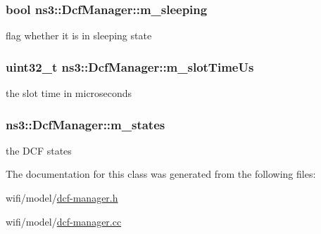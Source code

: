 \subsubsection[{\texorpdfstring{m\+\_\+sleeping}{m_sleeping}}]{\setlength{\rightskip}{0pt plus 5cm}bool ns3\+::\+Dcf\+Manager\+::m\+\_\+sleeping\hspace{0.3cm}{\ttfamily [private]}}\hypertarget{classns3_1_1DcfManager_aafbdf9bb6a0edaab12b82b6efa42ee93}{}\label{classns3_1_1DcfManager_aafbdf9bb6a0edaab12b82b6efa42ee93}


flag whether it is in sleeping state 

\subsubsection[{\texorpdfstring{m\+\_\+slot\+Time\+Us}{m_slotTimeUs}}]{\setlength{\rightskip}{0pt plus 5cm}uint32\+\_\+t ns3\+::\+Dcf\+Manager\+::m\+\_\+slot\+Time\+Us\hspace{0.3cm}{\ttfamily [private]}}\hypertarget{classns3_1_1DcfManager_adab37a3d40ff8e7afe578f5d1fde7ba3}{}\label{classns3_1_1DcfManager_adab37a3d40ff8e7afe578f5d1fde7ba3}


the slot time in microseconds 

\subsubsection[{\texorpdfstring{m\+\_\+states}{m_states}}]{ ns3\+::\+Dcf\+Manager\+::m\+\_\+states\hspace{0.3cm}{\ttfamily [private]}}\hypertarget{classns3_1_1DcfManager_a4999c9465af21e3ff6e0949f28f17466}{}\label{classns3_1_1DcfManager_a4999c9465af21e3ff6e0949f28f17466}


the D\+CF states 



The documentation for this class was generated from the following files\+:\begin{DoxyCompactItemize}
\item 
wifi/model/\hyperlink{dcf-manager_8h}{dcf-\/manager.\+h}\item 
wifi/model/\hyperlink{dcf-manager_8cc}{dcf-\/manager.\+cc}\end{DoxyCompactItemize}
